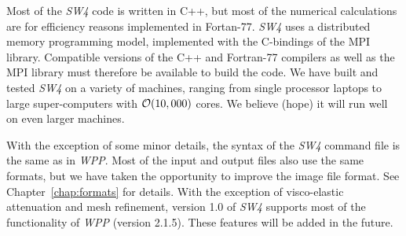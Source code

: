 \documentclass[11pt]{report}
\begin{document}


Most of the \emph{SW4} code is written in C++, but most of the numerical calculations are for
efficiency reasons implemented in Fortan-77. \emph{SW4} uses a distributed memory programming
model, implemented with the C-bindings of the MPI library. Compatible versions of the C++ and
Fortran-77 compilers as well as the MPI library must therefore be available to build the code. We
have built and tested \emph{SW4} on a variety of machines, ranging from single processor laptops to
large super-computers with ${\cal O}(10,000)$ cores. We believe (hope) it will run well on even
larger machines.

With the exception of some minor details, the syntax of the \emph{SW4} command file is the same as
in \emph{WPP}. Most of the input and output files also use the same formats, but we have taken the
opportunity to improve the image file format. See Chapter~\ref{chap:formats} for details. With the
exception of visco-elastic attenuation and mesh refinement, version 1.0 of \emph{SW4} supports most
of the functionality of \emph{WPP} (version 2.1.5). These features will be added in the future.
\end{document}
